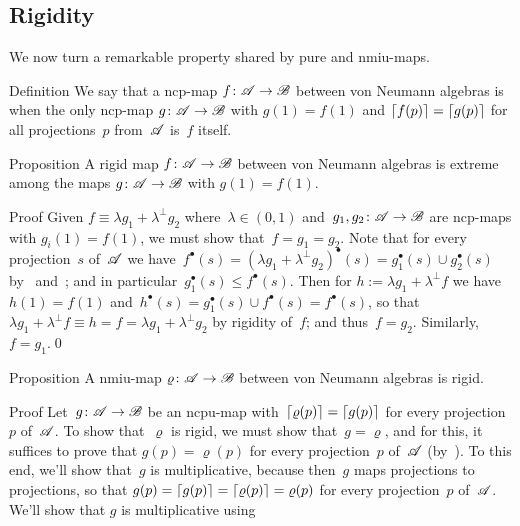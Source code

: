 \documentclass[a]{subfiles}
\begin{document}
\subsection{Rigidity}
\begin{parsec}%
\begin{point}%
We now turn a remarkable property shared
by pure and nmiu-maps.
\end{point}
\begin{point}[rigid]{Definition}%
We say that a ncp-map $f\colon \mathscr{A}\to\mathscr{B}$
between von Neumann algebras is 
when the only ncp-map $g\colon \mathscr{A}\to\mathscr{B}$
with $g(1)=f(1)$ and $\left\lceil f(p)\right\rceil=\left\lceil g(p)\right\rceil$ for all
projections~$p$ from~$\mathscr{A}$ is~$f$ itself.
\end{point}
\begin{point}{Proposition}%
A rigid map $f\colon \mathscr{A}\to\mathscr{B}$
between von Neumann algebras
is extreme among the maps $g\colon \mathscr{A}\to\mathscr{B}$
with $g(1)=f(1)$.
\begin{point}{Proof}%
Given $f\equiv \lambda g_1 + \lambda^\perp g_2$
where~$\lambda\in(0,1)$ 
and~$g_1,g_2\colon \mathscr{A}\to\mathscr{B}$
are ncp-maps with $g_i(1)=f(1)$,
we must show that~$f=g_1=g_2$.
Note that for every projection~$s$
of~$\mathscr{A}$
we have~$f^\bullet(s) = (\lambda g_1+\lambda^\perp g_2)^\bullet(s)
= g_1^\bullet(s)\cup g_2^\bullet(s)$
by~ and~;
and in particular~$g_1^\bullet(s)\leq f^\bullet(s)$.
Then for $h:=\lambda  g_1 + \lambda^\perp f$
we have $h(1)=f(1)$
and~$h^\bullet(s) = g_1^\bullet(s)\cup f^\bullet(s)
= f^\bullet(s)$,
so that~$\lambda g_1 + \lambda^\perp f \equiv 
h=f = \lambda g_1 +\lambda^\perp g_2$ by rigidity of~$f$;
and thus~$f=g_2$.
Similarly, $f=g_1$.\qed%
\end{point}
\end{point}
\begin{point}{Proposition}%
A nmiu-map $\varrho\colon \mathscr{A}\to\mathscr{B}$
between von Neumann algebras is rigid.
\begin{point}{Proof}%
Let~$g\colon \mathscr{A}\to\mathscr{B}$
be an ncpu-map
with~$\left\lceil\varrho(p)\right\rceil=\left\lceil g(p)\right\rceil$
for every projection~$p$ of~$\mathscr{A}$.
To show that~$\varrho$ is rigid,
we must show that~$g=\varrho$,
and for this, it suffices to prove that $g(p)=\varrho(p)$
for every projection~$p$ of~$\mathscr{A}$ (by~).
To this end, we'll show that~$g$ is multiplicative,
because then~$g$ maps projections to projections,
so that $g(p)=\left\lceil g(p)\right\rceil=\left\lceil\varrho(p)\right\rceil=\varrho(p)$
for every projection~$p$ of~$\mathscr{A}$.
We'll show that $g$ is multiplicative
using~

\end{point}
\end{point}
\end{parsec}
\end{document}
